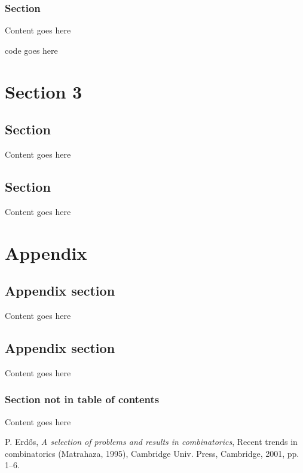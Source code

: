 \documentclass[12pt]{article}
\begin{document}
\subsubsection{Section}
Content goes here

\begin{scala}
code goes here
\end{scala}

\newpage

\section{Section 3}
\subsection{Section}
Content goes here

\subsection{Section}
Content goes here

\newpage
\section{Appendix}
\subsection{Appendix section}
Content goes here

\subsection{Appendix section}
Content goes here

\subsubsection*{Section not in table of contents}
Content goes here
\newpage
\begin{thebibliography}{9}
 P. Erd\H os, \emph{A selection of problems and
results in combinatorics}, Recent trends in combinatorics (Matrahaza,
1995), Cambridge Univ. Press, Cambridge, 2001, pp. 1--6.
\end{thebibliography}
\end{document}
